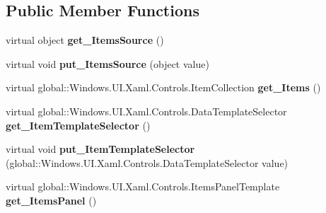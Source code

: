 \subsection*{Public Member Functions}
\begin{DoxyCompactItemize}
\item 
\mbox{\label{class_windows_1_1_u_i_1_1_xaml_1_1_controls_1_1_items_control_ada6978b5b6da9e42647e7bbae2efa4d9}} 
virtual object {\bfseries get\+\_\+\+Items\+Source} ()
\item 
\mbox{\label{class_windows_1_1_u_i_1_1_xaml_1_1_controls_1_1_items_control_aeea26f9c774f2e66be28cffd70420e8c}} 
virtual void {\bfseries put\+\_\+\+Items\+Source} (object value)
\item 
\mbox{\label{class_windows_1_1_u_i_1_1_xaml_1_1_controls_1_1_items_control_a5f5a8f9fc3aafc90d6f7e7ad33f58698}} 
virtual global\+::\+Windows.\+U\+I.\+Xaml.\+Controls.\+Item\+Collection {\bfseries get\+\_\+\+Items} ()
\item 
\mbox{\label{class_windows_1_1_u_i_1_1_xaml_1_1_controls_1_1_items_control_a9959b8e62f370e00b7c5ba03c1735a6c}} 
virtual global\+::\+Windows.\+U\+I.\+Xaml.\+Controls.\+Data\+Template\+Selector {\bfseries get\+\_\+\+Item\+Template\+Selector} ()
\item 
\mbox{\label{class_windows_1_1_u_i_1_1_xaml_1_1_controls_1_1_items_control_aa9c0c0db76f9d77b78c08b022e500e90}} 
virtual void {\bfseries put\+\_\+\+Item\+Template\+Selector} (global\+::\+Windows.\+U\+I.\+Xaml.\+Controls.\+Data\+Template\+Selector value)
\item 
\mbox{\label{class_windows_1_1_u_i_1_1_xaml_1_1_controls_1_1_items_control_a54332e55a6fbe6987c21c07fe342a9e2}} 
virtual global\+::\+Windows.\+U\+I.\+Xaml.\+Controls.\+Items\+Panel\+Template {\bfseries get\+\_\+\+Items\+Panel} ()
\item 
\mbox{\label{class_windows_1_1_u_i_1_1_xaml_1_1_controls_1_1_items_control_affd7b155eec7e46ac2c935a6634d6d21}} 

\end{DoxyCompactItemize}
